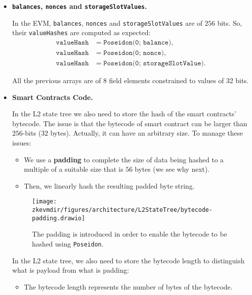 \begin{itemize}

\item \textbf{\texttt{balances}, \texttt{nonces} and \texttt{storageSlotValues}.}

In the EVM, \texttt{balances}, \texttt{nonces} and \texttt{storageSlotValues} are of $256$ bits. So, their \texttt{valueHashes} are computed as expected:
\begin{align*}
\texttt{valueHash} &= \texttt{Poseidon(0; balance)}, \\
\texttt{valueHash} &= \texttt{Poseidon(0; nonce)}, \\
\texttt{valueHash} &= \texttt{Poseidon(0; storageSlotValue)}.
\end{align*}

All the previous arrays are of 8 field elements constrained to values of 32 bits.

\item \textbf{Smart Contracts Code.}

In the L2 state tree we also need to store the hash of the smart contracts’ bytecode. The issue is that the bytecode of smart contract can be larger than $256$-bits ($32$ bytes). Actually, it can have an arbitrary size. To manage these issues:

\begin{itemize}

\item We use a \textbf{padding} to complete the size of data being hashed to a multiple of a suitable size that is $56$ bytes (we see why next).

\item Then, we linearly hash the resulting padded byte string.

\end{itemize}

\begin{figure}[H]
\centering
\texttt{[image: \\zkevmdir/figures/architecture/L2StateTree/bytecode-padding.drawio]}
\caption{The padding is introduced in order to enable the bytecode to be hashed using \texttt{Poseidon}. }
\label{fig:padding}
\end{figure}
In the L2 state tree, we also need to store the bytecode length to distinguish what is payload from what is padding:

\begin{itemize}

\item The bytecode length represents the number of bytes of the bytecode.


\end{itemize}
\end{itemize}
